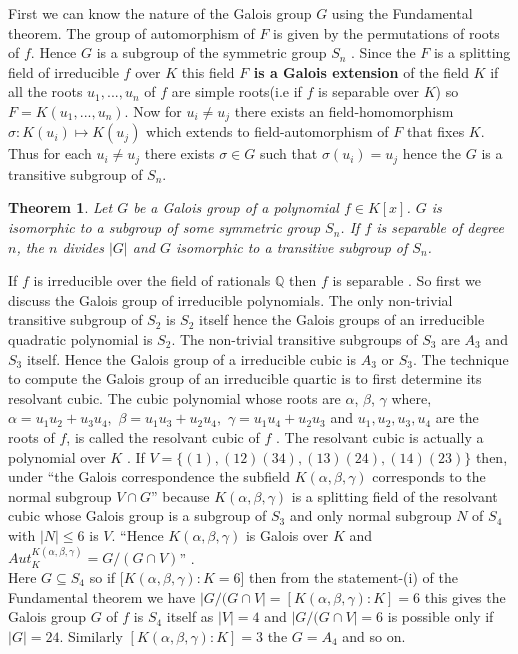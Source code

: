 \documentclass[a4paper,twoside,10pt]{article}
\theoremstyle{plain}
\newtheorem{theorem}{Theorem}[section]
\theoremstyle{definition}
\begin{document}
\noindent
First we can know the nature of the Galois group \(G\) using the Fundamental theorem. The group of automorphism of \(F\) is given by the permutations of roots of \(f\). Hence \(G\) is a subgroup of the symmetric group \(S_n\) \cite{hunger}. Since the  \(F\) is a splitting field of irreducible \(f\) over \(K\) this field \textbf{\(F\) is a Galois extension} of the field \(K\) if all the roots \(u_1,...,u_n\) of \(f\) are simple roots(i.e if \(f\) is separable over \(K\)) so \(F=K(u_1,...,u_n)\). Now for \(u_i \neq u_j\) there exists an field-homomorphism \( \sigma : K(u_i) \mapsto K(u_j) \) which extends to field-automorphism of \(F\) that fixes \(K\). Thus for each \(u_i \neq u_j\) there exists \(\sigma \in G\) such that \(\sigma(u_i) = u_j\) hence the \(G\) is a transitive subgroup of \(S_n\).

\begin{theorem} \cite{hunger}
  Let \(G\) be a Galois group of a polynomial \(f \in K[x]\). \(G\) is isomorphic to a subgroup of some symmetric group \(S_n\). If \(f\) is separable of degree \(n\), the \(n\) divides \(|G|\) and \(G\) isomorphic to a transitive subgroup of \(S_n\).
\end{theorem}

\noindent
If \(f\) is irreducible over the field of rationals \(\mathbb{Q}\) then \(f\) is separable \cite{hunger}. So first we discuss the Galois group of irreducible polynomials. The only non-trivial transitive subgroup of \(S_2\) is \(S_2\) itself hence the Galois groups of an irreducible quadratic polynomial is \(S_2\). The non-trivial transitive subgroups of \(S_3\) are \(A_3\) and \(S_3\) itself. Hence the Galois group of a irreducible cubic is \(A_3\) or \(S_3\). The technique to compute the Galois group of an irreducible quartic is to first determine its resolvant cubic. The cubic polynomial whose roots are \(\alpha\), \(\beta\), \(\gamma\) where, \(\alpha=u_1u_2+u_3u_4,\) \(\beta=u_1u_3+u_2u_4,\) \(\gamma=u_1u_4+u_2u_3\) and  \(u_1, u_2, u_3, u_4\) are the roots of \(f\), is called the resolvant cubic of \(f\) \cite{hunger}. The resolvant cubic is actually a polynomial over \(K\) \cite{hunger}. If \(V=\{(1),(12)(34),(13)(24),(14)(23)\}\) then, under ``the Galois correspondence the subfield \(K(\alpha, \beta, \gamma)\) corresponds to the normal subgroup \(V \cap G\)'' \cite{hunger} because \(K(\alpha,\beta,\gamma)\) is a splitting field of the resolvant cubic whose Galois group is a subgroup of \(S_3\) and only normal subgroup \(N\) of \(S_4\) with \(|N| \leq 6\) is \(V\). ``Hence \(K(\alpha, \beta, \gamma)\) is Galois over \(K\) and \(Aut_K^{K(\alpha, \beta, \gamma)} = G/(G \cap V)\)'' \cite{hunger}.\\[2mm]
Here \(G \subseteq S_4\) so if \([K(\alpha, \beta, \gamma):K=6\)] then from the statement-(i) of the Fundamental theorem we have \(|G/(G \cap V|= [K(\alpha, \beta, \gamma):K]=6\) this gives the Galois group \(G\) of \(f\) is \(S_4\) itself as \(|V|=4\) and \(|G/(G \cap V|=6\) is possible only if \(|G|=24\). Similarly  \([K(\alpha, \beta, \gamma):K]=3\) the \(G=A_4\) and so on.
\clearpage
\end{document}
